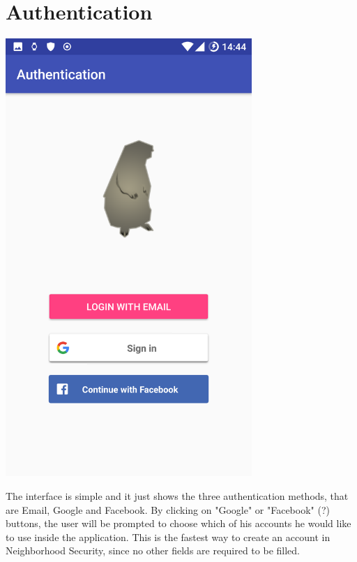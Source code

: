 \documentclass[a4paper]{scrreprt}
\begin{document}
\section{Authentication}
\begin{minipage}{0.5\textwidth}
	\centering
	\includegraphics[width=0.7\textwidth]{imgs/authentication}
\end{minipage}
\begin{minipage}{0.5\textwidth}
	The interface is simple and it just shows the three authentication methods, that are Email, Google and Facebook.
	By clicking on "Google" or "Facebook" (?) buttons, the user will be prompted to choose which of his accounts he would like to use inside the application. This is the fastest way to create an account in Neighborhood Security, since no other fields are required to be filled.
\end{minipage}
\end{document}
